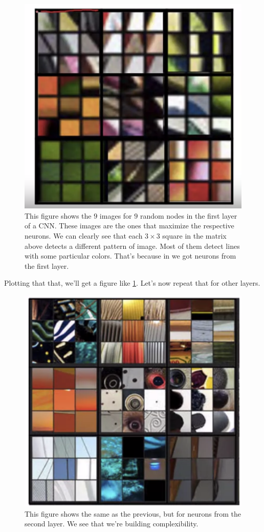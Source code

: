 \documentclass[12pt, a4paper, oneside]{book}
\begin{document}
\begin{figure}[h]
\centering
\includegraphics[scale=0.5]{Res/visualizing_cnn_1.png}
\caption{This figure shows the $9$ images for $9$ random nodes in the first
layer of a CNN. These images are the ones that maximize the respective neurons.
We can clearly see that each $3\times 3$ square in the matrix above detects a
different pattern of image. Most of them detect lines with some particular
colors. That's because in we got neurons from the first layer.}
\label{visualizing_cnn_1.png}
\end{figure}

Plotting that that, we'll get a figure like \ref{visualizing_cnn_1.png}. Let's
now repeat that for other layers.

\begin{figure}[h]
\centering
\includegraphics[scale=0.5]{Res/visualizing_cnn_2.png}
\caption{This figure shows the same as the previous, but for neurons from the
second layer. We see that we're building complexibility.}
\label{visualizing_cnn_2.png}
\end{figure}
\end{document}
